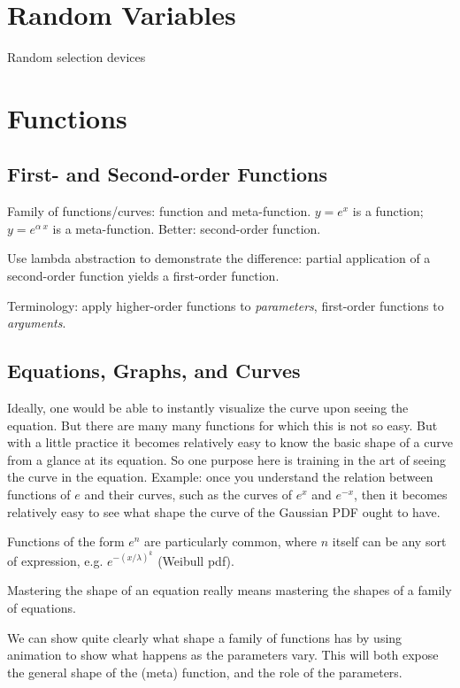 \chapter{Random Variables}

Random selection devices

\chapter{Functions}

\section{First- and Second-order Functions}

\begin{remark}
Family of functions/curves: function and meta-function.  $y=e^x$ is a
function; $y=e^{\alpha\ x}$ is a meta-function.  Better: second-order function.

Use lambda abstraction to demonstrate the difference: partial
application of a second-order function yields a first-order function.

Terminology: apply higher-order functions to \textit{parameters},
first-order functions to \textit{arguments}.
\end{remark}

\section{Equations, Graphs, and Curves}

\begin{remark}
  Ideally, one would be able to instantly visualize the curve upon
  seeing the equation.  But there are many many functions for which
  this is not so easy.  But with a little practice it becomes
  relatively easy to know the basic shape of a curve from a glance at
  its equation.  So one purpose here is training in the art of seeing
  the curve in the equation.  Example: once you understand the
  relation between functions of $e$ and their curves, such as the
  curves of $e^x$ and $e^{-x}$, then it becomes relatively easy to see
  what shape the curve of the Gaussian PDF ought to have.

  Functions of the form $e^n$ are particularly common, where $n$
  itself can be any sort of expression, e.g. $e^{-(x/\lambda)^k}$
  (Weibull pdf).

  Mastering the shape of an equation really means mastering the shapes
  of a family of equations.

  We can show quite clearly what shape a family of functions has by
  using animation to show what happens as the parameters vary.  This
  will both expose the general shape of the (meta) function, and the
  role of the parameters.
\end{remark}

